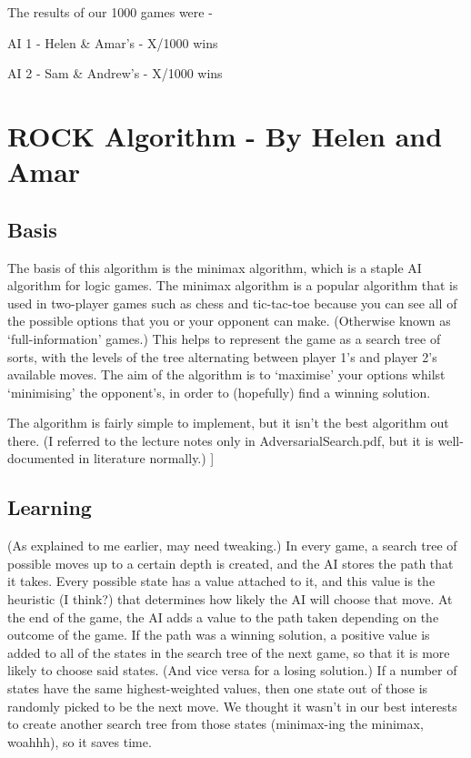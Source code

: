 \documentclass[11pt]{article}
\begin{document}
The results of our 1000 games were -

AI 1 - Helen \& Amar's - X/1000 wins

AI 2 - Sam \& Andrew's - X/1000 wins
\section{ROCK Algorithm - By Helen and Amar}
\label{sec-2}

\subsection{Basis}
\label{sec-2-1}

The basis of this algorithm is the minimax algorithm, which is a staple AI algorithm for logic games. The minimax algorithm is a popular algorithm that is used in two-player games such as chess and tic-tac-toe because you can see all of the possible options that you or your opponent can make. (Otherwise known as ‘full-information’ games.)  This helps to represent the game as a search tree of sorts, with the levels of the tree alternating between player 1’s and player 2’s available moves. The aim of the algorithm is to ‘maximise’ your options whilst ‘minimising’ the opponent’s, in order to (hopefully) find a winning solution.

The algorithm is fairly simple to implement, but it isn’t the best algorithm out there. (I referred to the lecture notes only in AdversarialSearch.pdf, but it is well-documented in literature normally.) ]
\subsection{Learning}
\label{sec-2-2}

(As explained to me earlier, may need tweaking.) In every game, a search tree of possible moves up to a certain depth is created, and the AI stores the path that it takes. Every possible state has a value attached to it, and this value is the heuristic (I think?) that determines how likely the AI will choose that move. At the end of the game, the AI adds a value to the path taken depending on the outcome of the game. If the path was a winning solution, a positive value is added to all of the states in the search tree of the next game, so that it is more likely to choose said states. (And vice versa for a losing solution.) If a number of states have the same highest-weighted values, then one state out of those is randomly picked to be the next move. We thought it wasn’t in our best interests to create another search tree from those states (minimax-ing the minimax, woahhh), so it saves time.
\end{document}

